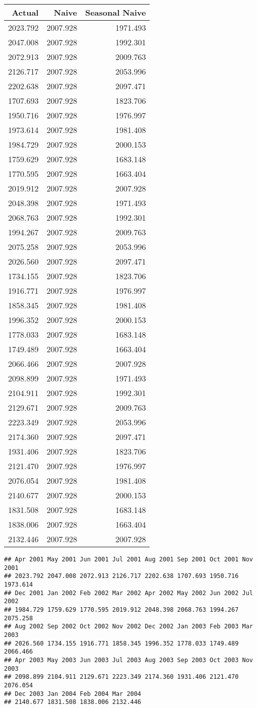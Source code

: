 \documentclass[]{article}
\begin{document}
\begin{longtable}[]{@{}rrr@{}}
\toprule
Actual & Naive & Seasonal Naive\tabularnewline
\midrule
\endhead
2023.792 & 2007.928 & 1971.493\tabularnewline
2047.008 & 2007.928 & 1992.301\tabularnewline
2072.913 & 2007.928 & 2009.763\tabularnewline
2126.717 & 2007.928 & 2053.996\tabularnewline
2202.638 & 2007.928 & 2097.471\tabularnewline
1707.693 & 2007.928 & 1823.706\tabularnewline
1950.716 & 2007.928 & 1976.997\tabularnewline
1973.614 & 2007.928 & 1981.408\tabularnewline
1984.729 & 2007.928 & 2000.153\tabularnewline
1759.629 & 2007.928 & 1683.148\tabularnewline
1770.595 & 2007.928 & 1663.404\tabularnewline
2019.912 & 2007.928 & 2007.928\tabularnewline
2048.398 & 2007.928 & 1971.493\tabularnewline
2068.763 & 2007.928 & 1992.301\tabularnewline
1994.267 & 2007.928 & 2009.763\tabularnewline
2075.258 & 2007.928 & 2053.996\tabularnewline
2026.560 & 2007.928 & 2097.471\tabularnewline
1734.155 & 2007.928 & 1823.706\tabularnewline
1916.771 & 2007.928 & 1976.997\tabularnewline
1858.345 & 2007.928 & 1981.408\tabularnewline
1996.352 & 2007.928 & 2000.153\tabularnewline
1778.033 & 2007.928 & 1683.148\tabularnewline
1749.489 & 2007.928 & 1663.404\tabularnewline
2066.466 & 2007.928 & 2007.928\tabularnewline
2098.899 & 2007.928 & 1971.493\tabularnewline
2104.911 & 2007.928 & 1992.301\tabularnewline
2129.671 & 2007.928 & 2009.763\tabularnewline
2223.349 & 2007.928 & 2053.996\tabularnewline
2174.360 & 2007.928 & 2097.471\tabularnewline
1931.406 & 2007.928 & 1823.706\tabularnewline
2121.470 & 2007.928 & 1976.997\tabularnewline
2076.054 & 2007.928 & 1981.408\tabularnewline
2140.677 & 2007.928 & 2000.153\tabularnewline
1831.508 & 2007.928 & 1683.148\tabularnewline
1838.006 & 2007.928 & 1663.404\tabularnewline
2132.446 & 2007.928 & 2007.928\tabularnewline
\bottomrule
\end{longtable}

\begin{verbatim}
## Apr 2001 May 2001 Jun 2001 Jul 2001 Aug 2001 Sep 2001 Oct 2001 Nov 2001 
## 2023.792 2047.008 2072.913 2126.717 2202.638 1707.693 1950.716 1973.614 
## Dec 2001 Jan 2002 Feb 2002 Mar 2002 Apr 2002 May 2002 Jun 2002 Jul 2002 
## 1984.729 1759.629 1770.595 2019.912 2048.398 2068.763 1994.267 2075.258 
## Aug 2002 Sep 2002 Oct 2002 Nov 2002 Dec 2002 Jan 2003 Feb 2003 Mar 2003 
## 2026.560 1734.155 1916.771 1858.345 1996.352 1778.033 1749.489 2066.466 
## Apr 2003 May 2003 Jun 2003 Jul 2003 Aug 2003 Sep 2003 Oct 2003 Nov 2003 
## 2098.899 2104.911 2129.671 2223.349 2174.360 1931.406 2121.470 2076.054 
## Dec 2003 Jan 2004 Feb 2004 Mar 2004 
## 2140.677 1831.508 1838.006 2132.446
\end{verbatim}
\end{document}
